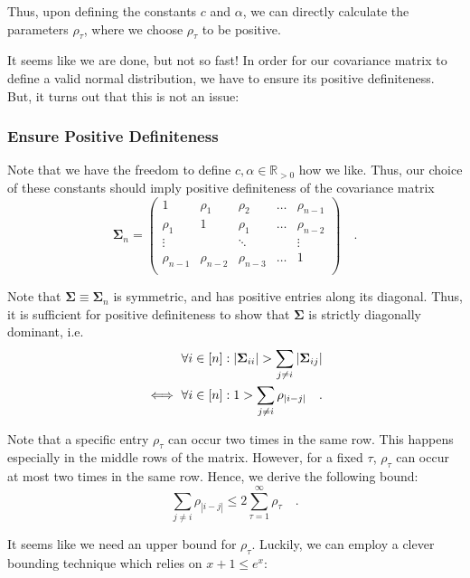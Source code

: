 \documentclass[../../main.tex]{subfiles}
\begin{document}
Thus, upon defining the constants $c$ and $\alpha$, we can directly calculate the parameters $\rho_\tau$, where we choose $\rho_\tau$ to be positive.

It seems like we are done, but not so fast! In order for our covariance matrix to define a valid normal distribution, we have to ensure its positive definiteness. But, it turns out that this is not an issue:

\subsubsection{Ensure Positive Definiteness}
Note that we have the freedom to define $c, \alpha \in \mathbb{R}_{>0}$ how we like. Thus, our choice of these constants should imply positive definiteness of the covariance matrix
\[
    \bm{\Sigma}_n = \begin{pmatrix*}
        1& \rho_1& \rho_2& \dots & \rho_{n-1} \\
        \rho_1& 1& \rho_1& \dots & \rho_{n-2} \\
        \vdots &  & \ddots & & \vdots \\
        \rho_{n-1} & \rho_{n-2} & \rho_{n-3} & \dots & 1 \\
    \end{pmatrix*}
    \quad .
\]

Note that $\bm{\Sigma} \equiv \bm{\Sigma}_n$ is symmetric, and has positive entries along its diagonal. Thus, it is sufficient for positive definiteness to show that $\bm{\Sigma}$ is strictly diagonally dominant, i.e.
\begin{align}
    &\forall i \in [n]: |\bm{\Sigma}_{ii}| > \sum_{j \neq i} |\bm{\Sigma}_{ij}| \notag \\
    \iff \ &\forall i \in [n]: 1 > \sum_{j \neq i} \rho_{|i-j|} \quad . \label{eq:diagonal_dominant}
\end{align}

Note that a specific entry $\rho_\tau$ can occur two times in the same row. This happens especially in the middle rows of the matrix. However, for a fixed $\tau$, $\rho_\tau$ can occur at most two times in the same row. Hence, we derive the following bound:
\begin{equation}
    \sum_{j \neq i} \rho_{|i-j|} \leq 2 \sum_{\tau = 1}^{\infty} \rho_\tau \quad . \label{eq:diagonal_dominant_sufficient}
\end{equation}

It seems like we need an upper bound for $\rho_\tau$. Luckily, we can employ a clever bounding technique which relies on $x + 1 \leq e^x$:
\end{document}
